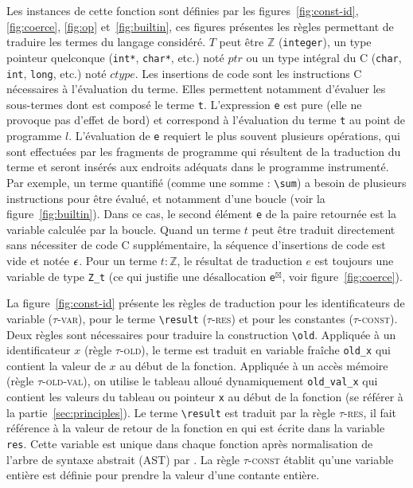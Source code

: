 Les instances de cette fonction sont définies par les
figures~\ref{fig:const-id}, \ref{fig:coerce}, \ref{fig:op} et~\ref{fig:builtin},
ces figures présentes les règles permettant de traduire les termes du langage
\eacsl considéré.
$T$ peut être $\mathbb{Z}$ (\lstinline'integer'), un type pointeur quelconque
(\lstinline'int*', \lstinline'char*', etc.) noté $ptr$ ou un type intégral du C
(\lstinline'char', \lstinline'int', \lstinline'long', etc.) noté $ctype$.
Les insertions de code sont les instructions C nécessaires à l'évaluation du
terme.
Elles permettent notamment d'évaluer les sous-termes dont est composé le terme
\lstinline't'.
L'expression \lstinline'e' est pure (elle ne provoque pas d'effet de bord) et
correspond à l'évaluation du terme \lstinline't' au point de programme $l$.
L'évaluation de \lstinline'e' requiert le plus souvent plusieurs opérations,
qui sont effectuées par les fragments de programme qui résultent de la
traduction du terme et seront insérés aux endroits adéquats dans le programme
instrumenté.
Par exemple, un terme quantifié (comme une somme : \lstinline'\sum') a besoin de
plusieurs instructions pour être évalué, et notamment d'une boucle (voir la
figure~\ref{fig:builtin}).
Dans ce cas, le second élément \lstinline'e' de la paire retournée est la
variable calculée par la boucle.
Quand un terme $t$ peut être traduit directement sans nécessiter de code C
supplémentaire, la séquence d'insertions de code est vide et notée $\epsilon$.
Pour un terme $t:\mathbb{Z}$, le résultat de traduction $e$ est toujours une
variable de type \lstinline'Z_t' (ce qui justifie une désallocation
\lstinline{e}${}^{\boxtimes}$, voir figure~\ref{fig:coerce}).

La figure~\ref{fig:const-id} présente les règles de traduction pour les
identificateurs de variable (\textsc{$\tau$-var}), pour le terme
\lstinline|\result| (\textsc{$\tau$-res}) et pour les constantes
(\textsc{$\tau$-const}).
Deux règles sont nécessaires pour traduire la construction \eacsl
\lstinline|\old|.
Appliquée à un identificateur $x$ (règle \textsc{$\tau$-old}), le terme est
traduit en variable fraîche \lstinline|old_x| qui contient la valeur de $x$ au
début de la fonction.
Appliquée à un accès mémoire (règle \textsc{$\tau$-old-val}), on utilise le
tableau alloué dynamiquement \lstinline|old_val_x| qui contient les valeurs du
tableau ou pointeur \lstinline'x' au début de la fonction (se référer à la
partie~\ref{sec:principles}).
Le terme \lstinline|\result| est traduit par la règle \textsc{$\tau$-res}, il
fait référence à la valeur de retour de la fonction en \eacsl qui est écrite
dans la variable \lstinline|res|.
Cette variable est unique dans chaque fonction après normalisation de l'arbre de
syntaxe abstrait (AST) par \framac.
La règle \textsc{$\tau$-const} établit qu'une variable entière est définie pour
prendre la valeur d'une contante entière.

